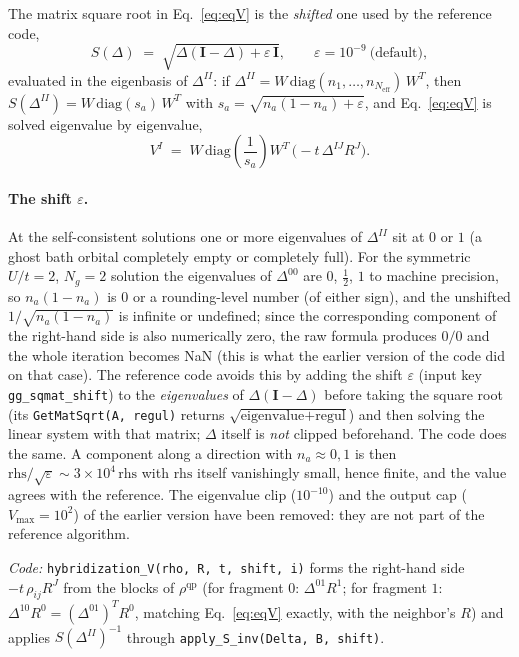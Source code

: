 \documentclass[11pt]{article}
\newcommand{\Neff}{N_{\mathrm{eff}}}
\newcommand{\Ng}{N_{g}}
\begin{document}
The matrix square root in Eq.~\eqref{eq:eqV} is the \emph{shifted} one used by
the reference code,
\begin{equation}
  S(\Delta) \;=\; \sqrt{\Delta(\mathbf I-\Delta)+\varepsilon\,\mathbf I},
  \qquad \varepsilon = 10^{-9}\ \text{(default)},
  \label{eq:Sshift}
\end{equation}
evaluated in the eigenbasis of $\Delta^{II}$: if
$\Delta^{II}=W\,\mathrm{diag}(n_1,\dots,n_{\Neff})\,W^{T}$, then
$S(\Delta^{II})=W\,\mathrm{diag}(s_a)\,W^{T}$ with
$s_a=\sqrt{n_a(1-n_a)+\varepsilon}$, and Eq.~\eqref{eq:eqV} is solved
eigenvalue by eigenvalue,
\begin{equation}
  V^{I} \;=\; W\,\mathrm{diag}\!\left(\frac{1}{s_a}\right)W^{T}\,
    \bigl(-t\,\Delta^{IJ}R^{J}\bigr).
\end{equation}

\paragraph{The shift $\varepsilon$.} At the self-consistent solutions one or
more eigenvalues of $\Delta^{II}$ sit at $0$ or $1$ (a ghost bath orbital
completely empty or completely full). For the symmetric $U/t=2$, $\Ng=2$
solution the eigenvalues of $\Delta^{00}$ are $0$, $\tfrac12$, $1$ to machine
precision, so $n_a(1-n_a)$ is $0$ or a rounding-level number (of either
sign), and the unshifted $1/\sqrt{n_a(1-n_a)}$ is infinite or undefined;
since the corresponding component of the right-hand side is also numerically
zero, the raw formula produces $0/0$ and the whole iteration becomes NaN
(this is what the earlier version of the code did on that case). The
reference code avoids this by adding the shift $\varepsilon$ (input key
\texttt{gg\_sqmat\_shift}) to the \emph{eigenvalues} of $\Delta(\mathbf
I-\Delta)$ before taking the square root (its \texttt{GetMatSqrt(A, regul)}
returns $\sqrt{\text{eigenvalue}+\text{regul}}$) and then solving the linear
system with that matrix; $\Delta$ itself is \emph{not} clipped beforehand.
The code does the same. A component along a direction with $n_a\approx0,1$ is
then $\text{rhs}/\sqrt\varepsilon\sim3\times10^{4}\,\text{rhs}$ with $\text{rhs}$
itself vanishingly small, hence finite, and the value agrees with the
reference. The eigenvalue clip ($10^{-10}$) and the output cap
($V_{\max}=10^{2}$) of the earlier version have been removed: they are not
part of the reference algorithm.

\emph{Code:} \texttt{hybridization\_V(rho, R, t, shift, i)} forms the
right-hand side $-t\,\rho_{ij}R^{J}$ from the blocks of $\rho^{\mathrm{qp}}$
(for fragment $0$: $\Delta^{01}R^1$; for fragment $1$:
$\Delta^{10}R^0=(\Delta^{01})^TR^0$, matching Eq.~\eqref{eq:eqV} exactly,
with the neighbor's $R$) and applies $S(\Delta^{II})^{-1}$ through
\texttt{apply\_S\_inv(Delta, B, shift)}.
\end{document}

